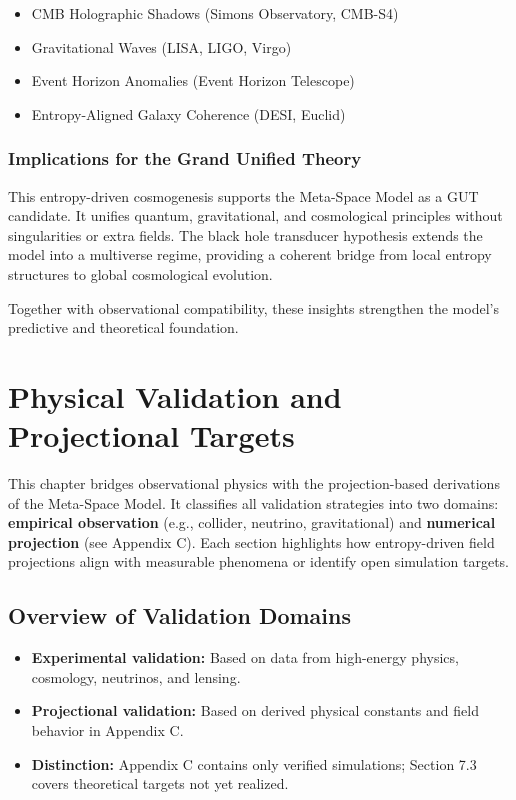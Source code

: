 \documentclass[10.5pt,a4paper]{article}
\begin{document}
\begin{itemize}
    \item CMB Holographic Shadows (Simons Observatory, CMB-S4)
    \item Gravitational Waves (LISA, LIGO, Virgo)
    \item Event Horizon Anomalies (Event Horizon Telescope)
    \item Entropy-Aligned Galaxy Coherence (DESI, Euclid)
\end{itemize}

\subsubsection{Implications for the Grand Unified Theory}

This entropy-driven cosmogenesis supports the Meta-Space Model as a GUT candidate. It unifies quantum, gravitational, and cosmological principles without singularities or extra fields. The black hole transducer hypothesis extends the model into a multiverse regime, providing a coherent bridge from local entropy structures to global cosmological evolution.

Together with observational compatibility, these insights strengthen the model’s predictive and theoretical foundation.

\clearpage

\section{Physical Validation and Projectional Targets}

This chapter bridges observational physics with the projection-based derivations of the Meta-Space Model. It classifies all validation strategies into two domains: \textbf{empirical observation} (e.g., collider, neutrino, gravitational) and \textbf{numerical projection} (see Appendix C). Each section highlights how entropy-driven field projections align with measurable phenomena or identify open simulation targets.

\subsection{Overview of Validation Domains}

\begin{itemize}
  \item \textbf{Experimental validation:} Based on data from high-energy physics, cosmology, neutrinos, and lensing.
  \item \textbf{Projectional validation:} Based on derived physical constants and field behavior in Appendix C.
  \item \textbf{Distinction:} Appendix C contains only verified simulations; Section 7.3 covers theoretical targets not yet realized.
\end{itemize}
\end{document}
